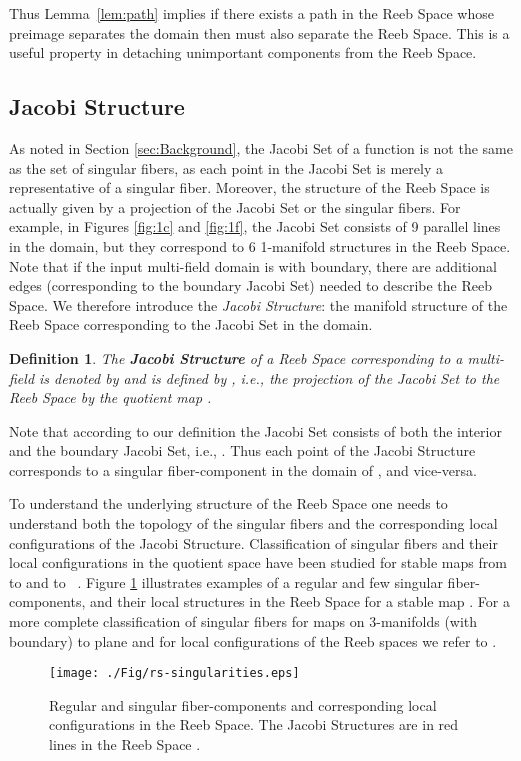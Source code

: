 \documentclass[twocolumn]{article}
\newcommand{\twofigref}[2]{Figures \ref{fig:#1} and \ref{fig:#2}}
\newtheorem{dfn}{Definition}[section]
\begin{document}
\noindent
Thus Lemma~\ref{lem:path} implies if there
exists a path  in the Reeb Space whose preimage  separates
the domain then  must also separate the Reeb Space. This is a 
useful property in detaching unimportant components from the Reeb Space.

\subsection{Jacobi Structure}
\label{subsec:Jacobi}
As noted in Section \ref{sec:Background}, the Jacobi Set of a function is not the same as the set of singular fibers, as each 
point in the Jacobi Set is merely a representative of a singular fiber. Moreover, the structure of 
the Reeb Space is actually given by a projection of the Jacobi Set or 
the singular fibers. For example, in 
\twofigref{1c}{1f}, the Jacobi Set consists of 9 parallel lines in the domain, but
they correspond to 6 1-manifold structures in the Reeb Space. 
Note that if the input multi-field domain is with boundary, there are
additional edges (corresponding to the boundary
 Jacobi Set) needed to describe the Reeb Space.
We therefore introduce the \emph{Jacobi Structure}: the 
manifold structure of the Reeb Space corresponding to the Jacobi Set
in the domain.

\begin{dfn}
The \textbf{Jacobi Structure} of a Reeb Space  corresponding to a
multi-field  is denoted
by  and is defined by , i.e., the projection of the Jacobi Set
 to the Reeb Space by the quotient map .
\end{dfn}

\noindent
Note that according to our definition the Jacobi Set  consists of both the interior and the
boundary Jacobi Set, i.e., .
Thus each point of the Jacobi Structure corresponds to a singular fiber-component
in the domain  of , and vice-versa. 


To understand the underlying structure of the Reeb Space
one needs to understand both the topology of the singular fibers 
and the corresponding local configurations of the Jacobi Structure. Classification of singular
fibers and their local configurations in the quotient space have been studied
for stable maps from  to  and  to ~\cite{2004-Saeki}.
Figure \ref{fig:jacobi} illustrates examples of a regular and few
singular fiber-components, and their local structures in the Reeb Space
\cite{Kushner-1984, Levine1985} for a stable map .
For a more complete classification of singular fibers for maps on 
3-manifolds (with boundary) to plane and for local configurations of the Reeb spaces we refer to \cite{Saeki2015, SaekiCobordism2015}.
\begin{figure}[t!]
\begin{center}
\texttt{[image: ./Fig/rs-singularities.eps]}
\end{center}
\caption{Regular and singular fiber-components and corresponding local configurations in
  the Reeb Space. The Jacobi Structures are in red lines in the Reeb
  Space \cite{Saeki2015}.}
\label{fig:jacobi}
\end{figure} 
\end{document}
